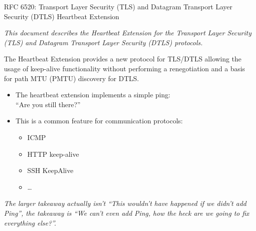 \documentclass[10pt]{beamer}
\begin{document}
\begin{frame}[allowframebreaks]{RFC 6520: Transport Layer Security (TLS) and Datagram Transport Layer Security (DTLS) Heartbeat Extension}

\begin{exampleblock}{}
  {\em This document describes the Heartbeat Extension for the Transport
   Layer Security (TLS) and Datagram Transport Layer Security (DTLS)
   protocols.

   The Heartbeat Extension provides a new protocol for TLS/DTLS allowing
   the usage of keep-alive functionality without performing a
   renegotiation and a basis for path MTU (PMTU) discovery for DTLS.}
  \vskip1mm
  \hspace*{}
\end{exampleblock} 

\framebreak

 \begin{itemize}
   \item The heartbeat extension implements a simple ping:\\``Are you still there?''
   \item This is a common feature for communication protocols:
   \begin{itemize}
    \item ICMP
    \item HTTP keep-alive
    \item SSH KeepAlive
    \item \dots
    \end{itemize}
 \end{itemize}

 \framebreak
 
\begin{exampleblock}{}
  {\em The larger takeaway actually isn't ``This wouldn't have happened if we didn't add Ping'', the takeaway is ``We can't even add Ping, how the heck are we going to fix everything else?''.}
  \vskip1mm
  \hspace*{}
\end{exampleblock} 
 
\begin{quote}
  
\end{quote}

\end{frame}
\end{document}
